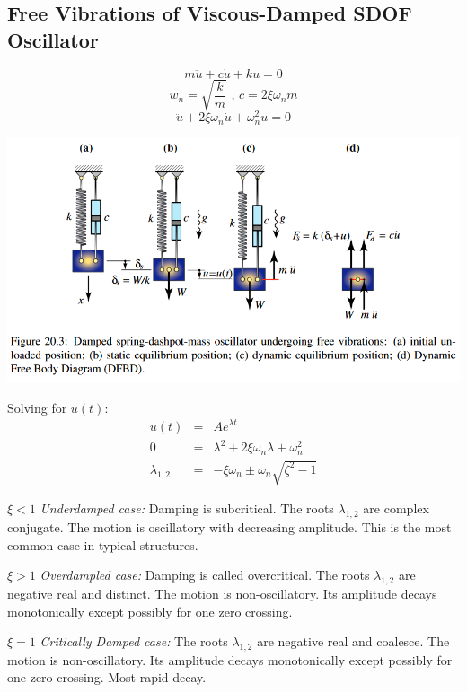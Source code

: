 \documentclass{article}
\begin{document}
\begin{multicols*}{2}
    \newpage
    \subsection*{Free Vibrations of Viscous-Damped SDOF Oscillator}
    $$\boxed{m\ddot{u}+c\dot{u}+ku=0}$$
    $$w_n=\sqrt{\frac{k}{m}} \text{ , } c=2\xi\omega_nm$$
    $$\boxed{\ddot{u}+2\xi\omega_n\dot{u}+\omega_n^2u=0}$$

    \includegraphics[width=\linewidth]{Figures/SDOF_Ddamped.png}

    Solving for $u(t)$:
    \begin{equation*}
        \begin{array}{lll}
            u(t) & = & Ae^{\lambda t}\\
            0 & = & \lambda^2+2\xi\omega_n\lambda+\omega_n^2\\
            \lambda_{1,2} & = & -\xi\omega_n\pm\omega_n\sqrt{\zeta^2-1}
        \end{array}
    \end{equation*}

    $\xi<1$ \textit{Underdamped case:} Damping is subcritical. The roots $\lambda_{1,2}$
    are complex conjugate. The motion is oscillatory with decreasing amplitude.
    This is the most common case in typical structures.\par 
    $\xi>1$ \textit{Overdampled case:} Damping is called overcritical. The roots
    $\lambda_{1,2}$ are negative real and distinct. The motion is non-oscillatory.
    Its amplitude decays monotonically except possibly for one zero crossing.\par 
    $\xi=1$ \textit{Critically Damped case:} The roots $\lambda_{1,2}$ are negative
    real and coalesce. The motion is non-oscillatory. Its amplitude decays monotonically
    except possibly for one zero crossing. Most rapid decay.


\end{multicols*}
\end{document}
